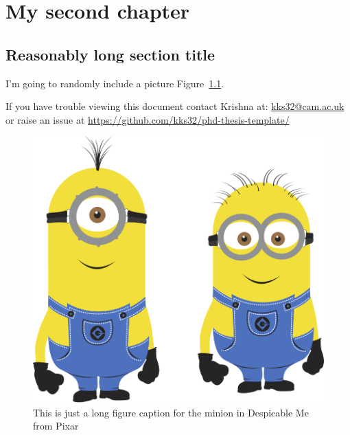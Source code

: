 
\chapter{My second chapter}

\ifpdf
    \graphicspath{{2_Chapter2/Figs/Raster/}{2_Chapter2/Figs/PDF/}{2_Chapter2/Figs/}}
\else
    \graphicspath{{2_Chapter2/Figs/Vector/}{2_Chapter2/Figs/}}
\fi


\section[Short title]{Reasonably long section title}

I'm going to randomly include a picture Figure~\ref{fig:minion}.


If you have trouble viewing this document contact Krishna at: \href{mailto:kks32@cam.ac.uk}{kks32@cam.ac.uk} or raise an issue at \url{https://github.com/kks32/phd-thesis-template/}


\begin{figure}[htbp!] 
\centering    
\includegraphics[width=1.0\textwidth]{minion}
\caption[Minion]{This is just a long figure caption for the minion in Despicable Me from Pixar}
\label{fig:minion}
\end{figure}


